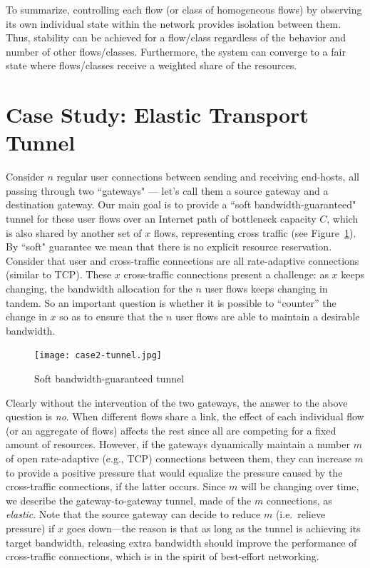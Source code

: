 \documentclass{article}
\begin{document}
To summarize,
controlling each flow (or class of homogeneous flows) 
by observing its own individual state 
within the network 
provides isolation between them.
Thus, stability can be achieved 
for a flow/class regardless of
the behavior and number of other flows/classes.
Furthermore, 
the system can converge to
a fair state where flows/classes receive
a weighted share of the resources.




\section{Case Study: Elastic Transport Tunnel}
\label{sec:case2}

  Consider $n$ regular user connections between sending and receiving
  end-hosts, all passing through two ``gateways" --- let's call them a source gateway and
  a destination gateway.  Our main goal
  is to provide a ``soft bandwidth-guaranteed" tunnel \cite{MinaBestavrosMattaX:iscc04} for these user
  flows over an Internet path of bottleneck capacity $C$, which is
  also shared by another set of $x$ flows, representing cross traffic
  (see Figure~\ref{fig:case2-tunnel}).
  By ``soft" guarantee we mean that there is no explicit resource reservation.
  Consider that user and cross-traffic connections
  are all rate-adaptive connections (similar to TCP). 
  These $x$ cross-traffic connections present a
  challenge: as $x$ keeps changing, the bandwidth allocation for the
  $n$ user flows keeps changing in tandem.  So an important
  question is whether it is possible to ``counter'' the change in $x$
  so as to ensure that the $n$ user flows are able to maintain a
  desirable bandwidth.
  
  \begin{figure}[htbp] %
     \centering
     \texttt{[image: case2-tunnel.jpg]} 
     \caption{Soft bandwidth-guaranteed tunnel}
     \label{fig:case2-tunnel}
  \end{figure}

Clearly without the intervention of the two gateways, the answer to the above
  question is {\em no}. When different flows share a link, the effect
  of each individual flow (or an aggregate of flows) affects the rest
  since all are competing for a fixed amount of resources.  However,
  if the gateways dynamically maintain a number $m$ of open rate-adaptive (e.g., TCP)
  connections between them, they can increase $m$ to provide a positive pressure that
  would equalize the pressure caused by the cross-traffic connections,
  if the latter occurs.  Since $m$ will be changing over time, we
  describe the gateway-to-gateway tunnel, made of the $m$ connections, as {\em elastic}.  Note that the
  source gateway can decide to reduce $m$ (i.e.\ relieve pressure) if $x$
  goes down---the reason is that as long as the tunnel is achieving
  its target bandwidth, releasing extra bandwidth should improve the
  performance of cross-traffic connections, which is in the spirit of
  best-effort networking.
\end{document}
